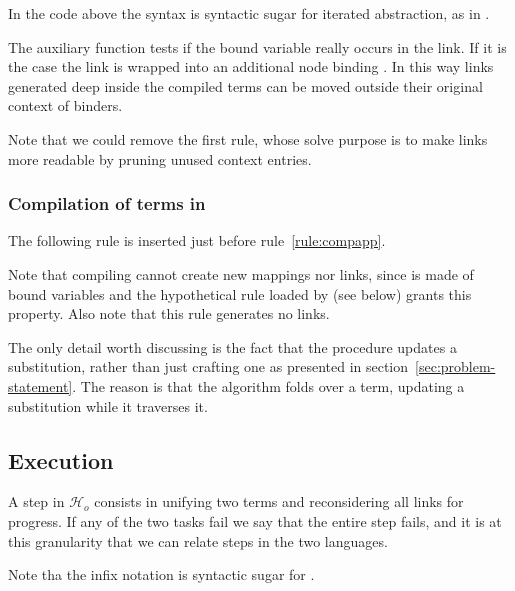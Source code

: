 \documentclass[sigconf,natbib=false,review]{acmart}
\newcommand{\UnifRel}{\ensuremath{\simeq}}
\newcommand{\Ue}{\ensuremath{\UnifRel_\lambda}\xspace}
\newcommand{\Ho}{\ensuremath{\mathcal{H}_o}\xspace}
\begin{document}


\noindent
In the code above the syntax  is syntactic sugar for
iterated  abstraction, as in .

The auxiliary function  tests if the bound variable
 really occurs in the link. If it is the case the link is wrapped into
an additional  node binding . In this way links generated
deep inside the compiled terms can be moved outside their original context
of binders.



\noindent
Note that we could remove the first rule, whose solve purpose is to make
links more readable by pruning unused context entries.

\subsubsection{Compilation of terms in \maybebeta}

The following rule is inserted just before rule~\ref{rule:compapp}.



\noindent
Note that compiling  cannot create new mappings nor links, since 
is made of bound variables and the hypothetical rule loaded by 
(see below) grants this property. Also note that this rule generates no links.


\noindent
The only detail worth discussing is the fact that the procedure updates a
substitution, rather than just crafting one as presented in
section~\ref{sec:problem-statement}. The reason is that the algorithm folds
over a term, updating a substitution while it traverses it.

\subsection{Execution}
\label{sec:execution}

A step in \Ho consists in unifying two terms and reconsidering all
links for progress. If any of the two tasks fail we say that the entire step
fails, and it is at this granularity that we can relate steps in the
two languages.




\noindent
Note tha the infix notation \elpiIn{((A ~\Ue~B) C D)} is syntactic sugar for
\elpiIn{((~\Ue\!\!\!~) A B C D)}.
\end{document}
